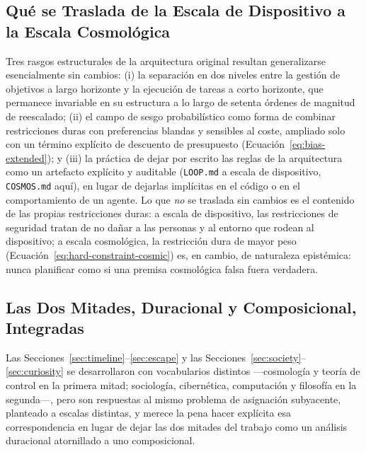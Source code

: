 \documentclass[11pt]{article}
\begin{document}
\subsection{Qué se Traslada de la Escala de Dispositivo a la Escala Cosmológica}

Tres rasgos estructurales de la arquitectura original resultan generalizarse esencialmente sin cambios: (i) la separación en dos niveles entre la gestión de objetivos a largo horizonte y la ejecución de tareas a corto horizonte, que permanece invariable en su estructura a lo largo de setenta órdenes de magnitud de reescalado; (ii) el campo de sesgo probabilístico como forma de combinar restricciones duras con preferencias blandas y sensibles al coste, ampliado solo con un término explícito de descuento de presupuesto (Ecuación~\ref{eq:bias-extended}); y (iii) la práctica de dejar por escrito las reglas de la arquitectura como un artefacto explícito y auditable (\texttt{LOOP.md} a escala de dispositivo, \texttt{COSMOS.md} aquí), en lugar de dejarlas implícitas en el código o en el comportamiento de un agente. Lo que \emph{no} se traslada sin cambios es el contenido de las propias restricciones duras: a escala de dispositivo, las restricciones de seguridad tratan de no dañar a las personas y al entorno que rodean al dispositivo; a escala cosmológica, la restricción dura de mayor peso (Ecuación~\ref{eq:hard-constraint-cosmic}) es, en cambio, de naturaleza epistémica: nunca planificar como si una premisa cosmológica falsa fuera verdadera.

\subsection{Las Dos Mitades, Duracional y Composicional, Integradas}

Las Secciones~\ref{sec:timeline}--\ref{sec:escape} y las Secciones~\ref{sec:society}--\ref{sec:curiosity} se desarrollaron con vocabularios distintos —cosmología y teoría de control en la primera mitad; sociología, cibernética, computación y filosofía en la segunda—, pero son respuestas al mismo problema de asignación subyacente, planteado a escalas distintas, y merece la pena hacer explícita esa correspondencia en lugar de dejar las dos mitades del trabajo como un análisis duracional atornillado a uno composicional.
\end{document}
